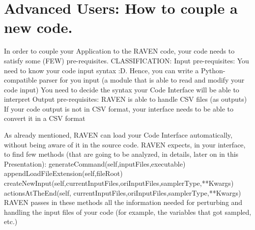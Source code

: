 \section{Advanced Users: How to couple a new code.  \\ \vspace{2 mm} {\small }}
\label{sec:newCodeCoupling}
In order to couple your Application to the RAVEN code, your code needs to satisfy some (FEW) pre-requisites.
CLASSIFICATION:
Input pre-requisites:
You need to know your code input syntax :D. Hence, you can write a Python-compatible parser for you input (a module that is able to read and modify your code input)
You need to decide the syntax your Code Interface will be able to interpret 
Output pre-requisites:
RAVEN is able to handle CSV files (as outputs)
If your code output is not in CSV format, your interface needs to be able to convert it in a CSV format





As already mentioned, RAVEN can load your Code Interface automatically, without being aware of it in the source code.
RAVEN expects, in your interface, to find few methods (that are going to be analyzed, in details, later on in this Presentation):
generateCommand(self,inputFiles,executable)
appendLoadFileExtension(self,fileRoot)
createNewInput(self,currentInputFiles,oriInputFiles,samplerType,**Kwargs)
actionsAtTheEnd(self, currentInputFiles,oriInputFiles,samplerType,**Kwargs)
RAVEN passes in these methods all  the information needed for perturbing and handling the input files of your code (for example, the variables that got sampled, etc.)

 